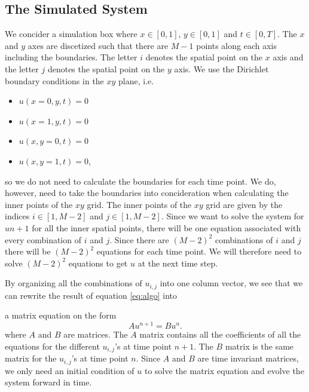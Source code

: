 \documentclass[english,notitlepage,reprint,nofootinbib]{revtex4-2}  %
\begin{document}
	\subsection{The Simulated System}
	\noindent
	We concider a simulation box where $x \in [0,1]$, $y \in [0,1]$ and $t \in [0,T]$. The $x$ and $y$ axes are discetized such
	that there are $M-1$ points along each axis including the boundaries. The letter $i$ denotes the
	spatial point on the $x$ axis and the letter $j$ denotes the spatial point on the $y$ axis.
	We use the Dirichlet boundary conditions in the $xy$ plane, i.e.
	\begin{itemize}
		\item $u(x=0, y, t) = 0$
		\item $u(x=1, y, t) = 0$
		\item $u(x, y=0, t) = 0$ 
		\item $u(x, y=1, t) = 0$,
	\end{itemize}
	so we do not need to calculate the boundaries for each time point. We do, however, need 
	to take the boundaries into concideration when calculating the inner points of the $xy$ grid.
	The inner points of the $xy$ grid are given by the indices $i \in [1,M-2]$ and 
	$j \in [1,M-2]$. Since we want to solve the system for $u{n+1}$ for all the inner
	spatial points, there will be one equation associated with every combination of $i$ and $j$. 
	Since there are $(M-2)^2$ combinations of $i$ and $j$ there will be 
	$(M-2)^2$ equations for each time point. We will therefore need to solve
	$(M-2)^2$ equations to get $u$ at the next time step. 

	By organizing all the combinations of $u_{i,j}$ into one column vector, 
	we see that we can rewrite the result of equation \ref{eq:algo} into
	
	
	
	
	a matrix equation on the form 
	\begin{equation}
		Au^{n+1} = Bu^n.	
	\end{equation} 	
	where $A$ and $B$ are matrices. The $A$ matrix contains all the coefficients of all the equations
	for the different $u_{i,j}$'s at time point $n+1$. The $B$ matrix is the same matrix for the 
	$u_{i,j}$'s at time point $n$. Since $A$ and $B$ are time invariant matrices,
	we only need an initial condition of $u$ to solve the matrix equation and evolve the system forward in time.\\ \\
	
\end{document}
